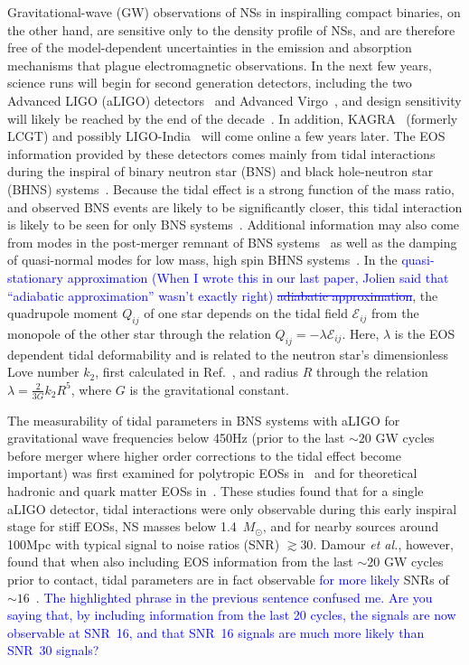 \documentclass[twocolumn,prd,amssymb,aps,nofootinbib,showpacs,epsf]{revtex4}
\newcommand\les[2]{\textcolor{blue}{{#1}\sout{#2}}}
\begin{document}
Gravitational-wave (GW) observations of NSs in inspiralling compact binaries, on the other hand, are sensitive only to the density profile of NSs, and are therefore free of the model-dependent uncertainties in the emission and absorption mechanisms that plague electromagnetic observations. In the next few years, science runs will begin for second generation detectors, including the two Advanced LIGO (aLIGO) detectors~\cite{Harry2010} and Advanced Virgo~\cite{Acernese2009}, and design sensitivity will likely be reached by the end of the decade~\cite{AasiAbadieAbbott2013}. In addition, \mbox{KAGRA}~\cite{Somiya2012} (formerly LCGT) and possibly LIGO-India~\cite{IyerSouradeepUnnikrishnan2011} will come online a few years later. The EOS information provided by these detectors comes mainly from tidal interactions during the inspiral of binary neutron star (BNS) and black hole-neutron star (BHNS) systems~\cite{FlanaganHinderer2008}. Because the tidal effect is a strong function of the mass ratio, and observed BNS events are likely to be significantly closer, this tidal interaction is likely to be seen for only BNS systems~\cite{PannaraleRezzollaOhmeRead2011}. Additional information may also come from modes in the post-merger remnant of BNS systems~\cite{StergioulasBausweinZagkouris2011, ClarkBausweinCadonati2014} as well as the damping of quasi-normal modes for low mass, high spin BHNS systems~\cite{LackeyKyutokuShibata2014}. In the \les{quasi-stationary approximation (When I wrote this in our last paper, Jolien said that ``adiabatic approximation'' wasn't exactly right) }{adiabatic approximation}, the quadrupole moment $Q_{ij}$ of one star depends on the tidal field $\mathcal{E}_{ij}$ from the monopole of the other star through the relation $Q_{ij} = -\lambda \mathcal{E}_{ij}$. Here, $\lambda$ is the EOS dependent tidal deformability and is related to the neutron star's dimensionless Love number $k_2$, first calculated in Ref.~\cite{Hinderer2008}, and radius $R$ through the relation $\lambda = \frac{2}{3G} k_2 R^5$, where $G$ is the gravitational constant.
 
The measurability of tidal parameters in BNS systems with aLIGO for gravitational wave frequencies below 450Hz (prior to the last $\sim 20$ GW cycles before merger where higher order corrections to the tidal effect become important) was first examined for polytropic EOSs in~\cite{FlanaganHinderer2008} and for theoretical hadronic and quark matter EOSs in~\cite{HindererLackeyLangRead2010}.  These studies found that for a single aLIGO detector, tidal interactions were only observable during this early inspiral stage for stiff EOSs, NS masses below 1.4~$M_\odot$, and for nearby sources around 100Mpc with typical signal to noise ratios (SNR) $\gtrsim 30$. Damour {\it et al.}, however, found that when also including EOS information from the last $\sim 20$ GW cycles prior to contact, tidal parameters are in fact observable \les{for more likely}{} SNRs of $\sim 16$~\cite{DamourNagarVillain2012}. \les{The highlighted phrase in the previous sentence confused me.  Are you saying that, by including information from the last 20 cycles, the signals are now observable at SNR~16, and that SNR~16 signals are much more likely than SNR~30 signals? }{}
\end{document}
